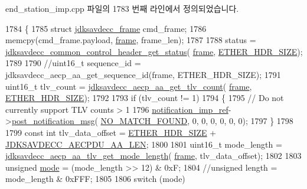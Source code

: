 end\+\_\+station\+\_\+imp.\+cpp 파일의 1783 번째 라인에서 정의되었습니다.


\begin{DoxyCode}
1784 \{
1785     \textcolor{keyword}{struct }\hyperlink{structjdksavdecc__frame}{jdksavdecc\_frame} cmd\_frame;
1786     memcpy(cmd\_frame.payload, \hyperlink{gst__avb__playbin_8c_ac8e710e0b5e994c0545d75d69868c6f0}{frame}, frame\_len);
1787 
1788     status = \hyperlink{group__jdksavdecc__avtp__common__control__header_ga4a4d44fa74bdb873eab982d74862273c}{jdksavdecc\_common\_control\_header\_get\_status}(
      \hyperlink{gst__avb__playbin_8c_ac8e710e0b5e994c0545d75d69868c6f0}{frame}, \hyperlink{namespaceavdecc__lib_a6c827b1a0d973e18119c5e3da518e65ca9512ad9b34302ba7048d88197e0a2dc0}{ETHER\_HDR\_SIZE});
1789 
1790     \textcolor{comment}{//uint16\_t sequence\_id = jdksavdecc\_aecp\_aa\_get\_sequence\_id(frame, ETHER\_HDR\_SIZE);}
1791     uint16\_t tlv\_count = \hyperlink{group___a_e_c_p___a_a_ga9bbfb30ebe22ee886ac1b783d64bd1aa}{jdksavdecc\_aecp\_aa\_get\_tlv\_count}(
      \hyperlink{gst__avb__playbin_8c_ac8e710e0b5e994c0545d75d69868c6f0}{frame}, \hyperlink{namespaceavdecc__lib_a6c827b1a0d973e18119c5e3da518e65ca9512ad9b34302ba7048d88197e0a2dc0}{ETHER\_HDR\_SIZE});
1792 
1793     \textcolor{keywordflow}{if} (tlv\_count != 1)
1794     \{
1795         \textcolor{comment}{// Do not currently support TLV counts > 1}
1796         \hyperlink{namespaceavdecc__lib_aca078f7550e970a17b3f732c26bc3d83}{notification\_imp\_ref}->\hyperlink{classavdecc__lib_1_1notification_a2775ca78354ea78d68bf107c084b3822}{post\_notification\_msg}(
      \hyperlink{namespaceavdecc__lib_ad2a3e740ca3019cf9fd0f9514afb6419ad0504a48cf7cd6bd199c9ceffade00ca}{NO\_MATCH\_FOUND}, 0, 0, 0, 0, 0, 0);
1797     \}
1798 
1799     \textcolor{keyword}{const} \textcolor{keywordtype}{int} tlv\_data\_offset = \hyperlink{namespaceavdecc__lib_a6c827b1a0d973e18119c5e3da518e65ca9512ad9b34302ba7048d88197e0a2dc0}{ETHER\_HDR\_SIZE} + 
      \hyperlink{group___a_e_c_p___a_a__offsets_ga624792b524d0f0f8ef18c2f4895003aa}{JDKSAVDECC\_AECPDU\_AA\_LEN};
1800 
1801     uint16\_t mode\_length = \hyperlink{group__aecp__aa__tlv_gab216c61c803887b69f5bed56b7291fe2}{jdksavdecc\_aecp\_aa\_tlv\_get\_mode\_length}(
      \hyperlink{gst__avb__playbin_8c_ac8e710e0b5e994c0545d75d69868c6f0}{frame}, tlv\_data\_offset);
1802 
1803     \textcolor{keywordtype}{unsigned} \hyperlink{rawsock__tx_8c_a1ea5d0cb93f22f7d0fdf804bd68c3326}{mode} = (mode\_length >> 12) & 0xF;
1804     \textcolor{comment}{//unsigned length = mode\_length & 0xFFF;}
1805 
1806     \textcolor{keywordflow}{switch} (mode)

\end{DoxyCode}
